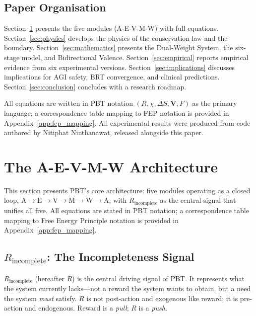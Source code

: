 \documentclass[12pt,a4paper]{article}
\begin{document}
\subsection{Paper Organisation}

Section~\ref{sec:modules} presents the five modules (A-E-V-M-W) with full
equations. Section~\ref{sec:physics} develops the physics of the conservation
law and the boundary. Section~\ref{sec:mathematics} presents the Dual-Weight
System, the six-stage model, and Bidirectional Valence. Section~\ref{sec:empirical}
reports empirical evidence from six experimental versions.
Section~\ref{sec:implications} discusses implications for AGI safety, BRT
convergence, and clinical predictions. Section~\ref{sec:conclusion} concludes
with a research roadmap.

All equations are written in PBT notation $(R, \chi, \Delta S, \mathbf{V}, F)$
as the primary language; a correspondence table mapping to FEP notation is
provided in Appendix~\ref{app:fep_mapping}. All experimental results were
produced from code authored by Nitiphat Ninthanawat, released alongside this
paper.

\section{The A-E-V-M-W Architecture}
\label{sec:modules}

This section presents PBT's core architecture: five modules operating as a
closed loop,
$\mathrm{A}\to\mathrm{E}\to\mathrm{V}\to\mathrm{M}\to\mathrm{W}\to\mathrm{A}$,
with $R_{\mathrm{incomplete}}$ as the central signal that unifies all five.
All equations are stated in PBT notation; a correspondence table mapping to
Free Energy Principle notation is provided in Appendix~\ref{app:fep_mapping}.

\subsection{$R_{\mathrm{incomplete}}$: The Incompleteness Signal}

$R_{\mathrm{incomplete}}$ (hereafter $R$) is the central driving signal of
PBT. It represents what the system currently lacks---not a reward the system
wants to obtain, but a need the system \emph{must} satisfy. $R$ is not
post-action and exogenous like reward; it is pre-action and endogenous. Reward
is a \emph{pull}; $R$ is a \emph{push}.
\end{document}
